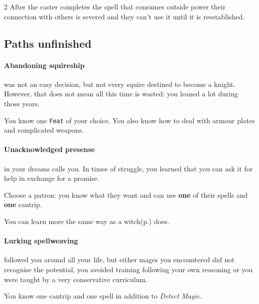 \begin{multicols*}{2}
After the caster completes the spell that consumes outside power their connection with others is severed and they can't use it until it is reestablished.













\newcolumn

\subsection*{Paths unfinished}

\paragraph{Abandoning squireship} was not an easy decision, but not every squire destined to become a knight. 
However, that does not mean all this time is wasted: you leaned a lot during those years. 

You know one \texttt{Feat} of your choice. You also know how to deal with armour plates and complicated weapons.

\paragraph{Unacknowledged presense} in your dreams calls you. In times of struggle, you learned that you can ask it for help in exchange for a promise. 

Choose a patron: you know what they want and can use \textbf{one} of their spells and \textbf{one} cantrip.

You can learn more the same way as a witch(p.\pageref*{sec:witchcraft}) does.
    
\paragraph{Lurking spellweaving} followed you around all your life, but either mages you encountered did not recognise the potential, you avoided training following your own reasoning or you were taught by a very conservative curriculum.


You know one cantrip and one spell in addition to \emph{Detect Magic}. 



\end{multicols*}
